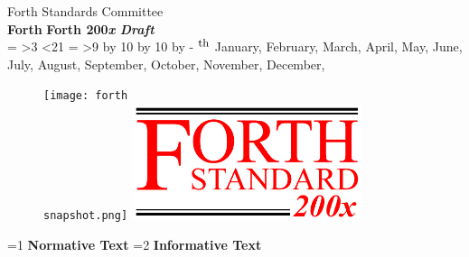 
\begin{titlepage}
\begin{flushright}
\LARGE
Forth Standards Committee \\[.2in]
\ifrelease
	\textbf{Forth \snapshot{} \release}
\else
	\textbf{Forth 200\emph{x} \textit{Draft \docversion}}
\fi \\[.2in]

\number\day%
%
\makeatletter
\@tempcnta=\day
\ifnum\@tempcnta>3
	\ifnum\@tempcnta<21
	\fi
\fi
%
\@tempcntb=\@tempcnta
\ifnum\@tempcnta>9
	\divide  \@tempcnta by 10
	\multiply\@tempcnta by 10
	\advance \@tempcntb by -\@tempcnta
\fi
%
$^{\mbox{\small
\ifcase\@tempcntb
    th%
\or st%
\or nd%
\or rd%
\else th\fi
}}$
\makeatother
%
\ifcase\month
\or January,
\or February,
\or March,
\or April,
\or May,
\or June,
\or July,
\or August,
\or September,
\or October,
\or November,
\or December,
\fi
%
\number\year
\end{flushright}

\vfill
\begin{figure}[ht]
  \begin{center}
	\ifrelease
		\texttt{[image: forth\\snapshot.png]}
	\else
		\includegraphics[bb=0 0 500 252,width=0.6\textwidth]{logo.png}
	\fi
  \end{center}
\end{figure}
\vfill


\makeatletter
\@tempswafalse
\ifinline
	\begin{center}
		\huge %
		\ifnum\value{part}=1 \textbf{Normative Text}\fi
		\ifnum\value{part}=2 \textbf{Informative Text}\fi
	\end{center}
\fi
\makeatother

\vfill


%



\end{titlepage}
